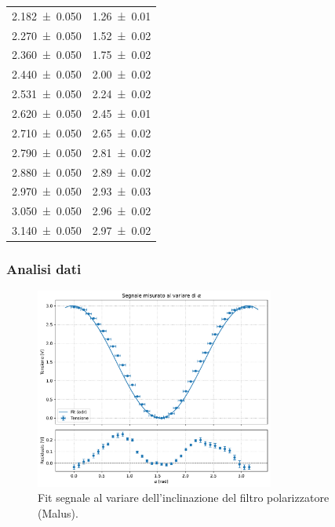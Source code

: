 \documentclass[a4paper]{article}
\begin{document}
\begin{table}[htbp]
\begin{tabular}{|c|c|}
\num{2.182 \pm 0.050} & \num{1.26 \pm 0.01} \\
\num{2.270 \pm 0.050} & \num{1.52 \pm 0.02} \\
\num{2.360 \pm 0.050} & \num{1.75 \pm 0.02} \\
\num{2.440 \pm 0.050} & \num{2.00 \pm 0.02} \\
\num{2.531 \pm 0.050} & \num{2.24 \pm 0.02} \\
\num{2.620 \pm 0.050} & \num{2.45 \pm 0.01} \\
\num{2.710 \pm 0.050} & \num{2.65 \pm 0.02} \\
\num{2.790 \pm 0.050} & \num{2.81 \pm 0.02} \\
\num{2.880 \pm 0.050} & \num{2.89 \pm 0.02} \\
\num{2.970 \pm 0.050} & \num{2.93 \pm 0.03} \\
\num{3.050 \pm 0.050} & \num{2.96 \pm 0.02} \\
\num{3.140 \pm 0.050} & \num{2.97 \pm 0.02} \\
\hline
\end{tabular}
\end{table}

\subsubsection{Analisi dati}
\begin{figure}[htbp]
	\centering
	\includegraphics[width=0.7\textwidth]{grafici/Malus.pdf}
	\caption{Fit segnale al variare dell'inclinazione del filtro polarizzatore (Malus).}
	\label{fig:Malus_grafico}
\end{figure}
\end{document}
